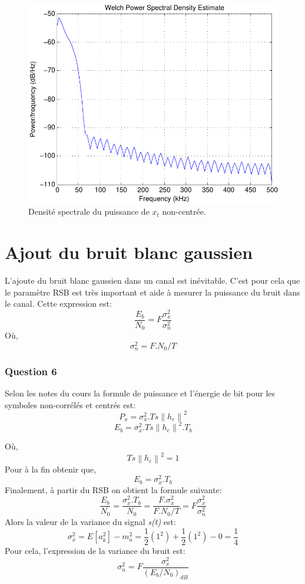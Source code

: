 \documentclass[a4paper,11pt]{article}
\begin{document}
\begin{figure}
	\begin{center}
	\includegraphics[scale=1]{welch_x_t_noncentree-crop.pdf}
	\caption{Densité spectrale du puissance de $x_t$ non-centrée.}
	\label{fig:ques5_Q4xt}
	\end{center}
\end{figure}

\section{Ajout du bruit blanc gaussien}
L'ajoute du bruit blanc gaussien dans un canal est inévitable. C'est pour cela que le paramètre RSB est très important et aide à mesurer la puissance du bruit dans le canal. Cette expression est:
\[ \frac{E_b}{N_0}=F\frac{\sigma ^{2}_x}{\sigma ^{2}_n}\]
Où, \[ \sigma ^{2}_n = F.N_0/T\]
\subsubsection*{Question 6}
Selon les notes du cours la formule de puissance et l'énergie de bit pour les symboles non-corrélés et centrés est:
\[ P_x=\sigma _x ^2.Ts\left \| h_e \right \|^2 \]
\[E_b=\sigma _x ^2.Ts\left \| h_e \right \|^2.T_b\]

Où, \[Ts\left \| h_e \right \|^2 = 1\]
Pour à la fin obtenir que,
\[E_b=\sigma _x ^2.T_b \]
Finalement, à partir du RSB on obtient la formule suivante:
\[\frac{E_b}{N_0}=\frac{\sigma _x ^2.T_b}{N_0} = \frac{F.\sigma _x ^2}{F.N_0/T} = 
F\frac{\sigma ^{2}_x}{\sigma ^{2}_n}
\]
Alors la valeur de la variance du signal \emph{s(t)} est:
\[\sigma _x ^2=E[a_k^2]-m_a^2= \frac{1}{2}(1^2)+\frac{1}{2}(1^2)-0=\frac{1}{4}\]
Pour cela, l'expression de la variance du bruit est:
\[\sigma _n ^2=F\frac{\sigma _x ^2}{(E_b/N_0)_{dB}}\]
\end{document}
